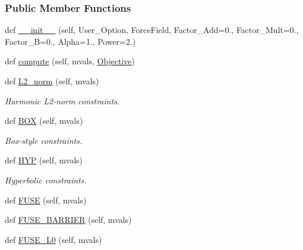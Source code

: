 \subsubsection*{Public Member Functions}
\begin{DoxyCompactItemize}
\item 
def \hyperlink{classsrc_1_1objective_1_1Penalty_acea9117e2aa54b3b6fed9a86d53fbe96}{\+\_\+\+\_\+init\+\_\+\+\_\+} (self, User\+\_\+\+Option, Force\+Field, Factor\+\_\+\+Add=0., Factor\+\_\+\+Mult=0., Factor\+\_\+B=0., Alpha=1., Power=2.)
\item 
def \hyperlink{classsrc_1_1objective_1_1Penalty_a234f3d0c04908c8fe275df0b4b09afd0}{compute} (self, mvals, \hyperlink{classsrc_1_1objective_1_1Objective}{Objective})
\item 
def \hyperlink{classsrc_1_1objective_1_1Penalty_ac462ae51ca2ed44c587b155a8b8f4a9a}{L2\+\_\+norm} (self, mvals)
\begin{DoxyCompactList}\small\item\em Harmonic L2-\/norm constraints. \end{DoxyCompactList}\item 
def \hyperlink{classsrc_1_1objective_1_1Penalty_a673bdca43bc69b1275fe96e235d3dc0b}{B\+OX} (self, mvals)
\begin{DoxyCompactList}\small\item\em Box-\/style constraints. \end{DoxyCompactList}\item 
def \hyperlink{classsrc_1_1objective_1_1Penalty_a20792a8b530d72cb0cddfde36b3be78d}{H\+YP} (self, mvals)
\begin{DoxyCompactList}\small\item\em Hyperbolic constraints. \end{DoxyCompactList}\item 
def \hyperlink{classsrc_1_1objective_1_1Penalty_a190dc5c3843732098b76a6bee4e6d1ec}{F\+U\+SE} (self, mvals)
\item 
def \hyperlink{classsrc_1_1objective_1_1Penalty_abb8686b72c5850e731ec5a96003a9237}{F\+U\+S\+E\+\_\+\+B\+A\+R\+R\+I\+ER} (self, mvals)
\item 
def \hyperlink{classsrc_1_1objective_1_1Penalty_a02a8b3d6848053c479808332cee91777}{F\+U\+S\+E\+\_\+\+L0} (self, mvals)
\end{DoxyCompactItemize}
